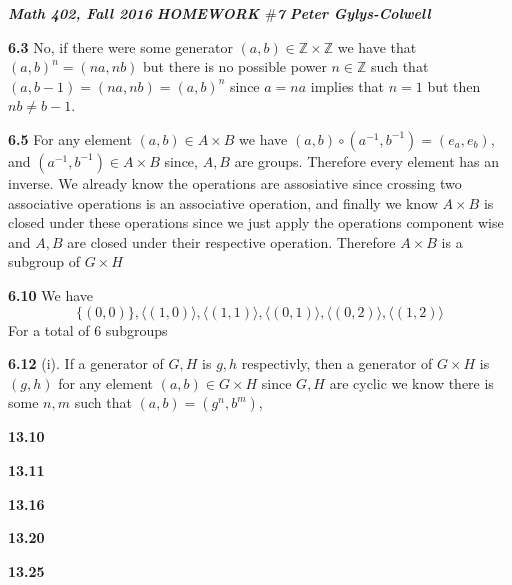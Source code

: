 \documentclass[12pt]{article}
\newenvironment{ques}{\vspace{2 ex}}{\vspace{2 ex}}
\theoremstyle{definition}
\begin{document}
\noindent \textit{\textbf{Math 402, Fall 2016}} \hspace{1.3cm}
\textit{\textbf{HOMEWORK $\#$7}} \hspace{1.3cm} \textit{\textbf{Peter
Gylys-Colwell}} 

\vspace{1cm}

\begin{ques}
	\textbf{6.3}
		No, if there were some generator $(a, b) \in \mathbb{Z} \times
		\mathbb{Z}$ we have that $(a, b)^n = (na, nb)$ but there is no
		possible power $n \in \mathbb{Z}$ such that $(a, b-1) = (na,
		nb) = (a, b)^n$ since $a = na$ implies that $n = 1$ but then
		$nb \neq b - 1$.
\end{ques}

\begin{ques}
	\textbf{6.5}
		For any element $(a, b) \in A \times B$ we have $(a, b) \circ
		(a^{-1}, b^{-1}) = (e_a, e_b)$, and $(a^{-1}, b^{-1}) \in A
		\times B$ since, $A, B$ are groups. Therefore every element has
		an inverse. We already know the operations are assosiative
		since crossing two associative operations is an associative
		operation, and
		finally we know $A \times B$ is closed under these operations
		since we just apply the operations component wise and $A, B$
		are closed under their respective operation. Therefore $A
		\times B$ is a subgroup of $G \times H$
\end{ques}

\begin{ques}
	\textbf{6.10}
		We have
		$$\{(0,0)\}, \langle (1, 0) \rangle, \langle (1, 1) \rangle, \langle (0,
		1) \rangle, \langle (0, 2) \rangle, \langle (1, 2) \rangle$$
		For a total of $6$ subgroups
\end{ques}

\begin{ques}
	\textbf{6.12}
		(i). If a generator of $G, H$ is $g, h$ respectivly, then a
		generator of $G \times H$ is $(g,h)$ for any element $(a, b)
		\in G \times H$ since $G, H$ are cyclic we know there is some
		$n, m$ such that $(a, b) = (g^n, b^m)$,
\end{ques}

\begin{ques}
	\textbf{13.10}
\end{ques}

\begin{ques}
	\textbf{13.11}
\end{ques}

\begin{ques}
	\textbf{13.16} 
\end{ques}

\begin{ques} 
	\textbf{13.20} 
\end{ques}

\begin{ques} 
	\textbf{13.25} 
\end{ques}
\end{document}
